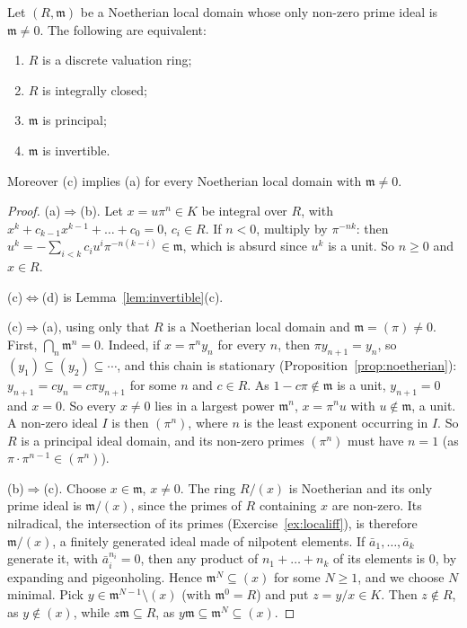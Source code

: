 \begin{theorem}\label{thm:dvr}
Let $(R,\mathfrak m)$ be a Noetherian local domain whose only non-zero prime ideal is $\mathfrak m\ne0$. The following are equivalent:
\begin{enumerate}[label=(\alph*)]
\item $R$ is a discrete valuation ring;
\item $R$ is integrally closed;
\item $\mathfrak m$ is principal;
\item $\mathfrak m$ is invertible.
\end{enumerate}
Moreover (c) implies (a) for every Noetherian local domain with $\mathfrak m\ne0$.
\end{theorem}

\begin{proof}
(a)$\Rightarrow$(b). Let $x=u\pi^n\in K$ be integral over $R$, with $x^k+c_{k-1}x^{k-1}+\dots+c_0=0$, $c_i\in R$. If $n<0$, multiply by $\pi^{-nk}$: then $u^k=-\sum_{i<k}c_iu^i\pi^{-n(k-i)}\in\mathfrak m$, which is absurd since
$u^k$ is a unit. So $n\ge0$ and $x\in R$.

(c)$\Leftrightarrow$(d) is Lemma~\ref{lem:invertible}(c).

(c)$\Rightarrow$(a), using only that $R$ is a Noetherian local domain and $\mathfrak m=(\pi)\ne0$. First, $\bigcap_n\mathfrak m^n=0$. Indeed, if $x=\pi^ny_n$ for every $n$, then $\pi y_{n+1}=y_n$, so
$(y_1)\subseteq(y_2)\subseteq\cdots$, and this chain is stationary (Proposition~\ref{prop:noetherian}): $y_{n+1}=cy_n=c\pi y_{n+1}$ for some $n$ and $c\in R$. As $1-c\pi\notin\mathfrak m$ is a unit, $y_{n+1}=0$ and $x=0$. So every
$x\ne0$ lies in a largest power $\mathfrak m^n$, $x=\pi^nu$ with $u\notin\mathfrak m$, a unit. A non-zero ideal $I$ is then $(\pi^n)$, where $n$ is the least exponent occurring in $I$. So $R$ is a principal ideal domain, and
its non-zero primes $(\pi^n)$ must have $n=1$ (as $\pi\cdot\pi^{n-1}\in(\pi^n)$).

(b)$\Rightarrow$(c). Choose $x\in\mathfrak m$, $x\ne0$. The ring $R/(x)$ is Noetherian and its only prime ideal is $\mathfrak m/(x)$, since the primes of $R$ containing $x$ are non-zero. Its nilradical, the intersection of its primes
(Exercise~\ref{ex:localiff}), is therefore $\mathfrak m/(x)$, a finitely generated ideal made of nilpotent elements. If $\bar a_1,\dots,\bar a_k$ generate it, with $\bar a_i^{n_i}=0$, then any product of $n_1+\dots+n_k$ of
its elements is $0$, by expanding and pigeonholing. Hence $\mathfrak m^N\subseteq(x)$ for some $N\ge1$, and we choose $N$ minimal. Pick $y\in\mathfrak m^{N-1}\setminus(x)$ (with $\mathfrak m^0=R$) and put $z=y/x\in K$. Then
$z\notin R$, as $y\notin(x)$, while $z\mathfrak m\subseteq R$, as $y\mathfrak m\subseteq\mathfrak m^N\subseteq(x)$.


\end{proof}
